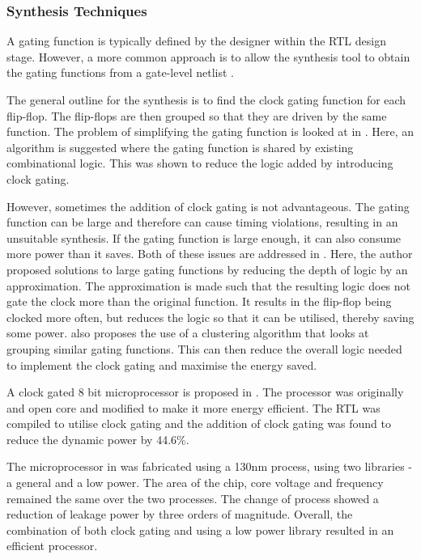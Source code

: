 \subsubsection{Synthesis Techniques}

A gating function is typically defined by the designer within the RTL design stage.
However, a more common approach is to allow the synthesis tool to obtain the gating functions from a gate-level netlist \cite{benini1999symbolic, hurst2008automatic}.

The general outline for the synthesis is to find the clock gating function for each flip-flop.
The flip-flops are then grouped so that they are driven by the same function. 
The problem of simplifying the gating function is looked at in \cite{han2012synthesis}. 
Here, an algorithm is suggested where the gating function is shared by existing combinational logic.
This was shown to reduce the logic added by introducing clock gating.

However, sometimes the addition of clock gating is not advantageous. 
The gating function can be large and therefore can cause timing violations, resulting in an unsuitable synthesis.
If the gating function is large enough, it can also consume more power than it saves.
Both of these issues are addressed in \cite{arbel2009resurrecting}.
Here, the author proposed solutions to large gating functions by reducing the depth of logic by an approximation. 
The approximation is made such that the resulting logic does not gate the clock more than the original function. 
It results in the flip-flop being clocked more often, but reduces the logic so that it can be utilised, thereby saving some power.
\cite{arbel2009resurrecting} also proposes the use of a clustering algorithm that looks at grouping similar gating functions. 
This can then reduce the overall logic needed to implement the clock gating and maximise the energy saved.

A clock gated 8 bit microprocessor is proposed in \cite{hoon2013energy}. 
The processor was originally and open core and modified to make it more energy efficient.
The RTL was compiled to utilise clock gating and the addition of clock gating was found to reduce the dynamic power by 44.6\%.

The microprocessor in \cite{hoon2013energy} was fabricated using a 130nm process, using two libraries - a general and a low power. 
The area of the chip, core voltage and frequency remained the same over the two processes. 
The change of process showed a reduction of leakage power by three orders of magnitude. 
Overall, the combination of both clock gating and using a low power library resulted in an efficient processor. 

